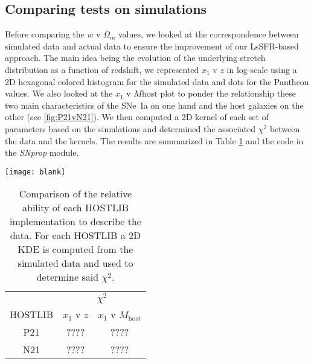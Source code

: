 \documentclass[../main/main.tex]{subfiles}
\begin{document}
\subsection{Comparing tests on simulations}
Before comparing the $w$ v $\Omega_m$ values, we looked at the correspondence
between simulated data and actual data to ensure the improvement of our
LsSFR-based approach. The main idea being the evolution of the underlying stretch
distribution as a function of redshift, we represented $x_1$ v $z$ in log-scale
using a 2D hexagonal colored histogram for the simulated data and dots for the
Pantheon values. We also looked at the $x_1$ v $M\mathrm{host}$ plot to ponder
the relationship these two main characteristics of the SNe~Ia on one hand and the
host galaxies on the other (see \ref{fig:P21vN21}). We then computed a 2D kernel
of each set of parameters based on the simulations and determined the associated
$\chi^2$ between the data and the kernels. The results are summarized in Table
\ref{tab:chi2comp} and the code in the \textit{SNprop} module.

\begin{figure*}
    \centering
    \texttt{[image: blank]}
    \caption{\textit{Top}: 2D hexagonal histograms of the simulated data using
    the P21 setup in color (left: $x_1$ v $z$, right: $x_1$ v $M_\mathrm{host}$)
    and actual Pantheon data in blue points. \textit{Bottom}: same data but
    2D hexagonal histograms of the simulated program using the N21 improved
    HOSTLIB.}
    \label{fig:P21vN21}
\end{figure*}

\begin{table}
    \centering
    \caption{Comparison of the relative ability of each HOSTLIB implementation
    to describe the data. For each HOSTLIB a 2D KDE is computed from the simulated
    data and used to determine said $\chi^2$.}
    \label{tab:chi2comp}
    \begin{tabular}{c|cc}
        \hline\hline
                & \multicolumn{2}{c}{$\chi^2$}
        \\
        HOSTLIB & $x_1$ v $z$ & $x_1$ v $M_\mathrm{host}$
        \\\hline
        P21     & ????        & ????
        \\
        N21     & ????        & ????
        \\
        \hline
    \end{tabular}
\end{table}
\end{document}

